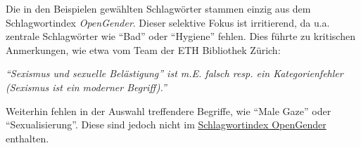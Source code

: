\documentclass[
  letterpaper,
  DIV=11,
  numbers=noendperiod]{scrartcl}
\begin{document}
\begin{tcolorbox}[enhanced jigsaw, arc=.35mm, left=2mm, coltitle=black, leftrule=.75mm, bottomrule=.15mm, colframe=quarto-callout-important-color-frame, bottomtitle=1mm, colback=white, toprule=.15mm, toptitle=1mm, opacityback=0, colbacktitle=quarto-callout-important-color!10!white, breakable, rightrule=.15mm, titlerule=0mm, title=\textcolor{quarto-callout-important-color}{\faExclamation}\hspace{0.5em}{Hinweis zur anstehenden Überarbeitung des Handbuchs}, opacitybacktitle=0.6]

Die in den Beispielen gewählten Schlagwörter stammen einzig aus dem
Schlagwortindex \emph{OpenGender}. Dieser selektive Fokus ist
irritierend, da u.a. zentrale Schlagwörter wie ``Bad'' oder ``Hygiene''
fehlen. Dies führte zu kritischen Anmerkungen, wie etwa vom Team der ETH
Bibliothek Zürich:

\emph{``Sexismus und sexuelle Belästigung'' ist m.E. falsch resp. ein
Kategorienfehler (Sexismus ist ein moderner Begriff).''}

Weiterhin fehlen in der Auswahl treffendere Begriffe, wie ``Male Gaze''
oder ``Sexualisierung''. Diese sind jedoch nicht im
\href{https://opengenderplatform.de/schlagwortindex\#:~:text=Der\%20Schlagwortindex\%20GenderOpen\%20ist\%20ein,besteht\%20aus\%20einem\%20kontrollierten\%20Vokabular}{Schlagwortindex
OpenGender} enthalten.

\end{tcolorbox}
\end{document}

